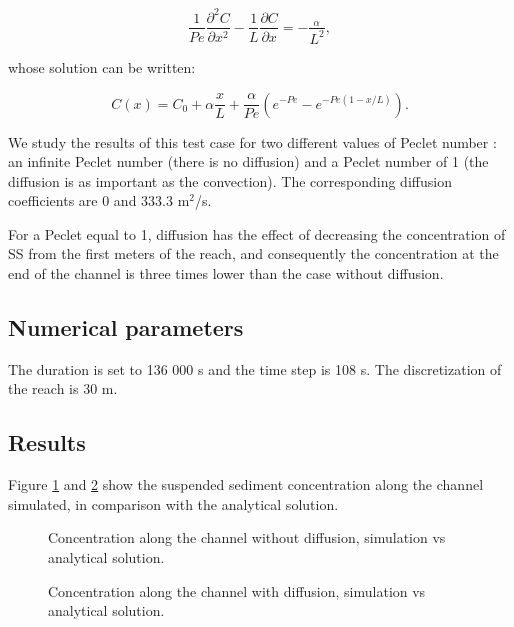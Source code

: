 \begin{equation}
\frac{1}{Pe} \frac{\partial^2 C}{\partial x^2} -
\frac{1}{L} \frac{\partial C}{\partial x} =- \frac{ _\alpha}{ L^2},
\label{eq:sol4}
\end{equation}

whose solution can be written:

\begin{equation}
C(x)=C_0+\alpha \frac{x}{L} + \frac{\alpha}{Pe}
\left( e^{-Pe}-e^{-Pe (1-x/L)} \right).
\label{eq:}
\end{equation}

We study the results of this test case for two different values of
Peclet number : an infinite Peclet number (there is no diffusion)
and a Peclet number of 1 (the diffusion is as important as the
convection). The corresponding diffusion coefficients are 0 and 333.3
m$^2$/s.

For a Peclet equal to 1, diffusion has the effect of decreasing the
concentration of SS from the first meters of the reach, and
consequently the concentration at the end of the channel is three
times lower than the case without diffusion.

\subsection{Numerical parameters}

The duration is set to 136 000 s and the time step is 108 s.
The discretization of the reach is 30 m.

\subsection{Results}

Figure \ref{fig:erosion:nodiff} and \ref{fig:erosion:diff} show the
suspended sediment concentration along the channel simulated, in
comparison with the analytical solution.

\begin{figure}[h]
 \centering
 \caption{Concentration along the channel without diffusion,
  simulation vs analytical solution.}
 \label{fig:erosion:nodiff}
\end{figure}

\begin{figure}[h]
 \centering
 \caption{Concentration along the channel with diffusion,
  simulation vs analytical solution.}
 \label{fig:erosion:diff}
\end{figure}

